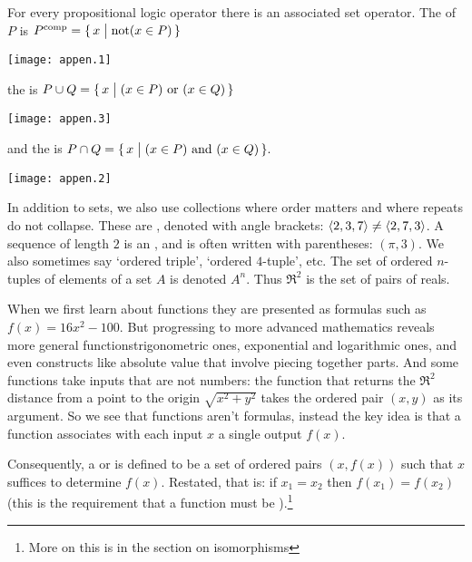 For every propositional logic operator there is an associated set
operator.
The 
of \( P \) is
\( P^{\text{comp}}=\mbox{$\{\,x\bigm| \text{not$( x\in P)$}\,\}$} \)
\begin{center}
  \texttt{[image: appen.1]}
\end{center}
\noindent
the  is
\( P\cup Q=\mbox{$\{\,x\bigm| \text{$(x\in P)$ or $(x\in Q)$}\,\}$} \)
\begin{center}
  \texttt{[image: appen.3]}
\end{center}
and the  is
\( P\cap Q=\mbox{$\{\,x\bigm| \text{$(x\in P)$ and $(x\in Q)$}\,\}$}. \)
\begin{center}
  \texttt{[image: appen.2]}
\end{center}



In addition to sets,
we also use collections where order matters and where repeats do
not collapse.
These are , denoted with angle brackets:
\( \langle 2,3,7\rangle\neq\langle2,7,3\rangle \).
A sequence of length \( 2 \) is an 
,
and is often written with parentheses: \( (\pi,3) \).
We also sometimes say `ordered triple', `ordered \( 4 \)-tuple', etc.
The set of ordered \( n \)-tuples of elements of a set \( A \) is denoted
\( A^n \).
Thus \( \Re^2 \) is the set of pairs of reals.




When we first learn about functions they are
presented as formulas such as \( f(x)=16x^2-100 \).
But progressing to more advanced mathematics reveals more general
functions\Dash trigonometric ones, exponential and
logarithmic ones, and even constructs like absolute value that involve
piecing together parts. 
And some functions take inputs that are not numbers:
the function that returns the $\Re^2$ distance from a point to the origin 
\( \sqrt{x^2+y^2} \)
takes the ordered pair \( (x,y) \) as its argument.
So we see that functions aren't
formulas, instead the key idea is that a function associates with each
input \( x \) a single output \( f(x) \).

Consequently, a  
or  is defined
to be a set of ordered pairs \( (x,f(x)) \)
such that \( x \) suffices to determine \( f(x) \).
Restated, that is:
if \( x_1=x_2 \) then \( f(x_1)=f(x_2) \)
(this is the requirement that a
function must be %
).\footnote{More on this is in the section
on isomorphisms}

